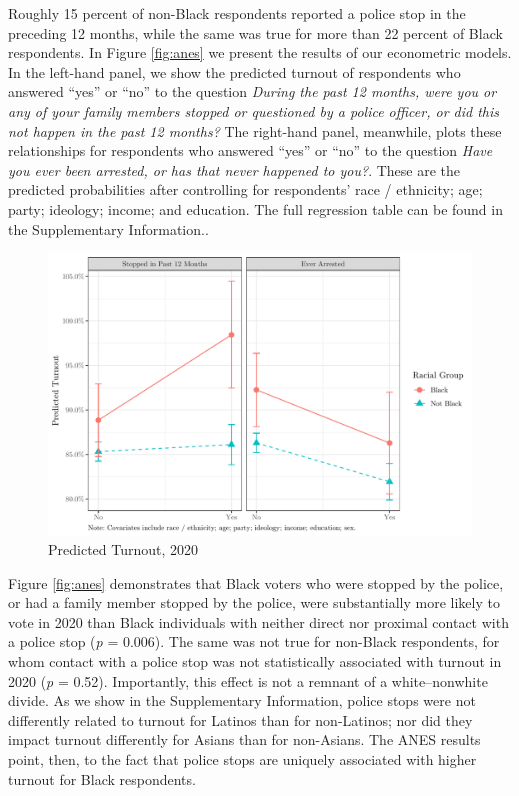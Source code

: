 \documentclass[
  12pt,
]{article}
\begin{document}
Roughly 15 percent of non-Black respondents reported a police stop in the preceding 12 months, while the same was true for more than 22 percent of Black respondents. In Figure \ref{fig:anes} we present the results of our econometric models. In the left-hand panel, we show the predicted turnout of respondents who answered ``yes'' or ``no'' to the question \emph{During the past 12 months, were you or any of your family members stopped or questioned by a police officer, or did this not happen in the past 12 months?} The right-hand panel, meanwhile, plots these relationships for respondents who answered ``yes'' or ``no'' to the question \emph{Have you ever been arrested, or has that never happened to you?}. These are the predicted probabilities after controlling for respondents' race / ethnicity; age; party; ideology; income; and education. The full regression table can be found in the Supplementary Information..

\begin{figure}[!htpb]

{\centering \includegraphics{draft_paper_files/figure-latex/anes-cross-1} 

}

\caption{\label{fig:anes}Predicted Turnout, 2020}\label{fig:anes-cross}
\end{figure}

Figure \ref{fig:anes} demonstrates that Black voters who were stopped by the police, or had a family member stopped by the police, were substantially more likely to vote in 2020 than Black individuals with neither direct nor proximal contact with a police stop (\emph{p} = 0.006). The same was not true for non-Black respondents, for whom contact with a police stop was not statistically associated with turnout in 2020 (\emph{p} = 0.52). Importantly, this effect is not a remnant of a white--nonwhite divide. As we show in the Supplementary Information, police stops were not differently related to turnout for Latinos than for non-Latinos; nor did they impact turnout differently for Asians than for non-Asians. The ANES results point, then, to the fact that police stops are uniquely associated with higher turnout for Black respondents.
\end{document}
